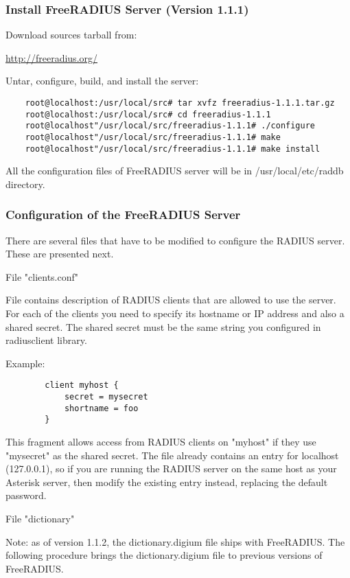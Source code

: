 \subsubsection{Install FreeRADIUS Server (Version 1.1.1)}

	Download sources tarball from:

		\url{http://freeradius.org/}

	Untar, configure, build, and install the server:

\begin{verbatim}
	root@localhost:/usr/local/src# tar xvfz freeradius-1.1.1.tar.gz
	root@localhost:/usr/local/src# cd freeradius-1.1.1
	root@localhost"/usr/local/src/freeradius-1.1.1# ./configure
	root@localhost"/usr/local/src/freeradius-1.1.1# make
	root@localhost"/usr/local/src/freeradius-1.1.1# make install
\end{verbatim}

	All the configuration files of FreeRADIUS server will be in
	/usr/local/etc/raddb directory.


\subsubsection{Configuration of the FreeRADIUS Server}

	There are several files that have to be modified to configure the
	RADIUS server. These are presented next.

	File "clients.conf"

	File  contains description of
	RADIUS clients that are allowed to use the server. For each of the
	clients you need to specify its hostname or IP address and also a
	shared secret. The shared secret must be the same string you configured
	in radiusclient library.

	Example:
\begin{verbatim}
		client myhost {
		    secret = mysecret
		    shortname = foo
		}
\end{verbatim}

	This fragment allows access from RADIUS clients on "myhost" if they use
	"mysecret" as the shared secret.
	The file already contains an entry for localhost (127.0.0.1), so if you
	are running the RADIUS server on the same host as your Asterisk server,
	then modify the existing entry instead, replacing the default password.

	File "dictionary"

	Note: as of version 1.1.2, the dictionary.digium file ships with FreeRADIUS.
	The following procedure brings the dictionary.digium file to previous versions
	of FreeRADIUS.

